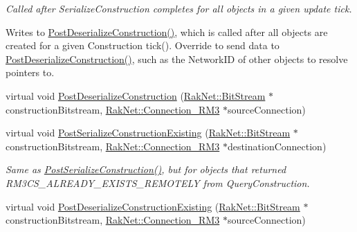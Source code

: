 \begin{DoxyCompactItemize}
\begin{DoxyCompactList}\small\item\em Called after Serialize\-Construction completes for all objects in a given update tick.\par
 Writes to \hyperlink{class_rak_net_1_1_replica3_composite_ac8258f928d6922f928c5d842c62c8094}{Post\-Deserialize\-Construction()}, which is called after all objects are created for a given Construction tick(). Override to send data to \hyperlink{class_rak_net_1_1_replica3_composite_ac8258f928d6922f928c5d842c62c8094}{Post\-Deserialize\-Construction()}, such as the Network\-I\-D of other objects to resolve pointers to. \end{DoxyCompactList}\item 
virtual void \hyperlink{class_rak_net_1_1_replica3_composite_ac8258f928d6922f928c5d842c62c8094}{Post\-Deserialize\-Construction} (\hyperlink{class_rak_net_1_1_bit_stream}{Rak\-Net\-::\-Bit\-Stream} $\ast$construction\-Bitstream, \hyperlink{class_rak_net_1_1_connection___r_m3}{Rak\-Net\-::\-Connection\-\_\-\-R\-M3} $\ast$source\-Connection)
\item 
\hypertarget{class_rak_net_1_1_replica3_composite_ae2a7b59ce8d14197a3b82f2850308b43}{virtual void \hyperlink{class_rak_net_1_1_replica3_composite_ae2a7b59ce8d14197a3b82f2850308b43}{Post\-Serialize\-Construction\-Existing} (\hyperlink{class_rak_net_1_1_bit_stream}{Rak\-Net\-::\-Bit\-Stream} $\ast$construction\-Bitstream, \hyperlink{class_rak_net_1_1_connection___r_m3}{Rak\-Net\-::\-Connection\-\_\-\-R\-M3} $\ast$destination\-Connection)}\label{class_rak_net_1_1_replica3_composite_ae2a7b59ce8d14197a3b82f2850308b43}

\begin{DoxyCompactList}\small\item\em Same as \hyperlink{class_rak_net_1_1_replica3_composite_a73424eca7c3bdd1140d82c2ee635fffe}{Post\-Serialize\-Construction()}, but for objects that returned R\-M3\-C\-S\-\_\-\-A\-L\-R\-E\-A\-D\-Y\-\_\-\-E\-X\-I\-S\-T\-S\-\_\-\-R\-E\-M\-O\-T\-E\-L\-Y from Query\-Construction. \end{DoxyCompactList}\item 
\hypertarget{class_rak_net_1_1_replica3_composite_ad1a000e80755b5fefb7cda84926a4ef5}{virtual void \hyperlink{class_rak_net_1_1_replica3_composite_ad1a000e80755b5fefb7cda84926a4ef5}{Post\-Deserialize\-Construction\-Existing} (\hyperlink{class_rak_net_1_1_bit_stream}{Rak\-Net\-::\-Bit\-Stream} $\ast$construction\-Bitstream, \hyperlink{class_rak_net_1_1_connection___r_m3}{Rak\-Net\-::\-Connection\-\_\-\-R\-M3} $\ast$source\-Connection)}\label{class_rak_net_1_1_replica3_composite_ad1a000e80755b5fefb7cda84926a4ef5}


\end{DoxyCompactItemize}
